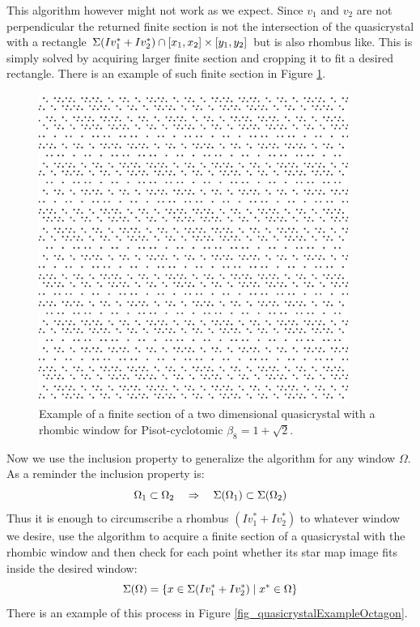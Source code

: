 \documentclass[text.tex]{subfiles}
\begin{document}
This algorithm however might not work as we expect. Since $v_1$ and $v_2$ are not perpendicular the returned finite section is not the intersection of the quasicrystal with a rectangle $\Sigma(Iv_1^\ast+Iv_2^\ast)\cap[x_1,x_2]\times[y_1,y_2]$ but is also rhombus like. This is simply solved by acquiring larger finite section and cropping it to fit a desired rectangle. There is an example of such finite section in Figure \ref{fig_quasicrystalExampleRhombus}. 

\begin{figure}[h!]
\centering
\includegraphics[width=0.9\textwidth]{img/2D/rhombus}
\caption{Example of a finite section of a two dimensional quasicrystal with a rhombic window for Pisot-cyclotomic $\beta_8=1+\sqrt{2}$.}
\label{fig_quasicrystalExampleRhombus}
\end{figure}

Now we use the inclusion property to generalize the algorithm for any window $\Omega$. As a reminder the inclusion property is: 
$$\Omega_1\subset\Omega_2 \quad\Rightarrow\quad \Sigma(\Omega_1)\subset\Sigma(\Omega_2)$$
Thus it is enough to circumscribe a rhombus $(Iv_1^\ast+Iv_2^\ast)$ to whatever window we desire, use the algorithm to acquire a finite section of a quasicrystal with the rhombic window and then check for each point whether its star map image fits inside the desired window: 
$$\Sigma(\Omega) = \{ x \in \Sigma(Iv_1^\ast+Iv_2^\ast)\; |\; x^\ast\in \Omega\}$$
There is an example of this process in Figure \ref{fig_quasicrystalExampleOctagon}. 
\end{document}

